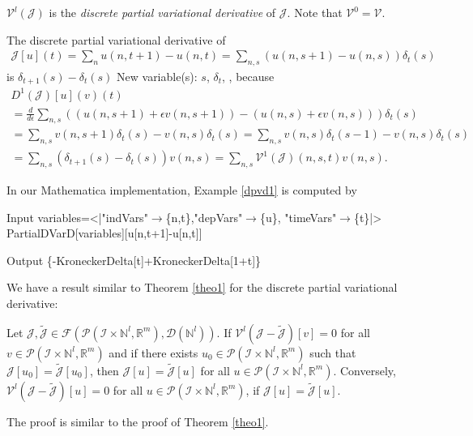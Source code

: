 \documentclass[runningheads]{llncs}
\newcommand{\1}{\chi}
\begin{document}
\normalsize
\begin{definition}
\(\mathcal{V}^l(\mathcal{J})\) is the \emph{discrete partial variational derivative} of \(\mathcal{J}\).
	Note that \(\mathcal{V}^0=\mathcal{V}\).
\end{definition}
\begin{example}
	\label{dpvd1}
	The discrete partial variational derivative of 
	\begin{gather*}
		\mathcal{J}[u](t)=\sum_nu(n,t+1)-u(n,t)=\sum_{n,s}(u(n,s+1)-u(n,s))\delta_t(s)
	\end{gather*}
	is \(\delta_{t+1}(s)-\delta_t(s)\)
{\color{blue} New variable(s): \(s\), \(\delta _t\),  }
, because
	\small
	\begin{gather*}
		D^1(\mathcal{J})[u](v)(t)\\
		=\frac{d}{d\epsilon} \sum_{n,s}((u(n,s+1)+\epsilon v(n,s+1))-(u(n,s)+\epsilon v(n,s)))\delta_t(s)\\
		=\sum_{n,s}v(n,s+1)\delta_t(s)-v(n,s)\delta_t(s)=\sum_{n,s}v(n,s)\delta_t(s-1)-v(n,s)\delta_t(s)\\
		=\sum_{n,s}(\delta_{t+1}(s)-\delta_t(s))v(n,s)=\sum_{n,s}\mathcal{V}^1(\mathcal{J})(n,s,t)v(n,s).
	\end{gather*}
	\normalsize
\end{example}
\begin{example}
	In our {\sc Mathematica} implementation, Example \ref{dpvd1} is computed by
		
	\begin{small}
		\begin{mmaCell}[moredefined={variables, expression, PartialDVarD}]{Input}
  variables=<|"indVars"\(\pmb{\to}\)\{n,t\},"depVars"\(\pmb{\to}\)\{u\},
  "timeVars"\(\pmb{\to}\)\{t\}|>
  PartialDVarD[variables][u[n,t+1]-u[n,t]]
  
\end{mmaCell}
		\begin{mmaCell}{Output}
  \{-KroneckerDelta[t]+KroneckerDelta[1+t]\}
\end{mmaCell}
	\end{small}
\end{example}
We have a result similar to Theorem \ref{theo1} for the discrete partial variational derivative:
\begin{theorem}\label{theo2}
	Let \(\mathcal{J},\tilde{\mathcal{J}}\in \mathcal{F}(\mathcal{P}(\mathcal{I}\times\mathbb{N}^l,\mathbb{R}^m),\mathcal{D}(\mathbb{N}^l))\). If \(\mathcal{V}^l(\mathcal{J}-\tilde{\mathcal{J}})[v]=0\) for all \(v\in\mathcal{P}(\mathcal{I}\times\mathbb{N}^l,\mathbb{R}^m)\) and if there exists \(u_0\in\mathcal{P}(\mathcal{I}\times\mathbb{N}^l,\mathbb{R}^m)\) such that \(\mathcal{J}[u_0]=\tilde{\mathcal{J}}[u_0]\), then
	\(\mathcal{J}[u]=\tilde{\mathcal{J}}[u]\)
	for all \(u\in\mathcal{P}(\mathcal{I}\times\mathbb{N}^l,\mathbb{R}^m)\).
	Conversely,
	\(\mathcal{V}^l(\mathcal{J}-\tilde{\mathcal{J}})[u]=0\)
	for all \(u\in\mathcal{P}(\mathcal{I}\times\mathbb{N}^l,\mathbb{R}^m)\), if \(\mathcal{J}[u]=\tilde{\mathcal{J}}[u]\).
\end{theorem}
The proof is similar to the proof of Theorem \ref{theo1}.
\end{document}
